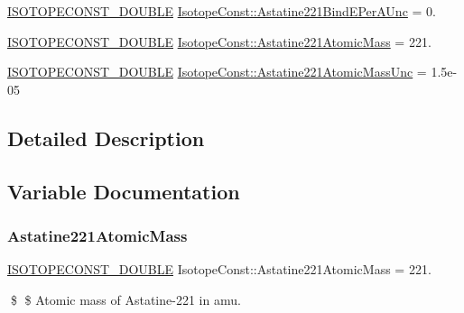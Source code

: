 \begin{DoxyCompactItemize}
\mbox{\hyperlink{group___isotope_const-_macros_ga8f45a7272ce02c0b4c65c44636ed719a}{I\+S\+O\+T\+O\+P\+E\+C\+O\+N\+S\+T\+\_\+\+D\+O\+U\+B\+LE}} \mbox{\hyperlink{group___isotope_const-_astatine-_at221_ga0fe83a156cdf17b1cef4a074e6a36bbb}{Isotope\+Const\+::\+Astatine221\+Bind\+E\+Per\+A\+Unc}} = 0.
\item 
\mbox{\hyperlink{group___isotope_const-_macros_ga8f45a7272ce02c0b4c65c44636ed719a}{I\+S\+O\+T\+O\+P\+E\+C\+O\+N\+S\+T\+\_\+\+D\+O\+U\+B\+LE}} \mbox{\hyperlink{group___isotope_const-_astatine-_at221_ga1fef2414040f7c6d8c06da21e1af3ed3}{Isotope\+Const\+::\+Astatine221\+Atomic\+Mass}} = 221.
\item 
\mbox{\hyperlink{group___isotope_const-_macros_ga8f45a7272ce02c0b4c65c44636ed719a}{I\+S\+O\+T\+O\+P\+E\+C\+O\+N\+S\+T\+\_\+\+D\+O\+U\+B\+LE}} \mbox{\hyperlink{group___isotope_const-_astatine-_at221_ga0f6d50139fd78ae23fbb41d6673daeac}{Isotope\+Const\+::\+Astatine221\+Atomic\+Mass\+Unc}} = 1.\+5e-\/05
\end{DoxyCompactItemize}


\subsection{Detailed Description}


\subsection{Variable Documentation}
\mbox{\label{group___isotope_const-_astatine-_at221_ga1fef2414040f7c6d8c06da21e1af3ed3}} 
\subsubsection{\texorpdfstring{Astatine221\+Atomic\+Mass}{Astatine221AtomicMass}}
{\footnotesize\ttfamily \mbox{\hyperlink{group___isotope_const-_macros_ga8f45a7272ce02c0b4c65c44636ed719a}{I\+S\+O\+T\+O\+P\+E\+C\+O\+N\+S\+T\+\_\+\+D\+O\+U\+B\+LE}} Isotope\+Const\+::\+Astatine221\+Atomic\+Mass = 221.}

\$ \$ Atomic mass of Astatine-\/221 in amu. \mbox{\label{group___isotope_const-_astatine-_at221_ga0f6d50139fd78ae23fbb41d6673daeac}} 
